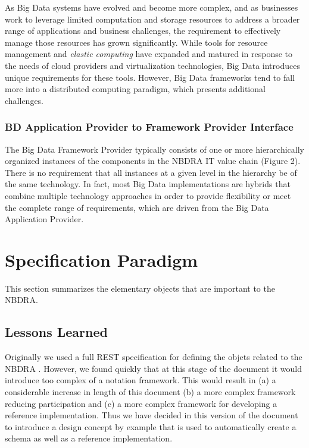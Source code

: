 \documentclass[10pt]{article}
\begin{document}
As Big Data systems have evolved and become more complex, and as
businesses work to leverage limited computation and storage resources
to address a broader range of applications and business challenges,
the requirement to effectively manage those resources has grown
significantly. While tools for resource management and {\it elastic
computing} have expanded and matured in response to the needs of cloud
providers and virtualization technologies, Big Data introduces unique
requirements for these tools. However, Big Data frameworks tend to
fall more into a distributed computing paradigm, which presents
additional challenges.

\subsubsection{BD Application Provider to Framework Provider
  Interface}\label{S:r-app-provider}

The Big Data Framework Provider typically consists of one or more
hierarchically organized instances of the components in the NBDRA IT
value chain (Figure 2). There is no requirement that all instances at
a given level in the hierarchy be of the same technology. In fact,
most Big Data implementations are hybrids that combine multiple
technology approaches in order to provide flexibility or meet the
complete range of requirements, which are driven from the Big Data
Application Provider.


	
\section{Specification Paradigm}

This section summarizes the elementary objects that are important to
the NBDRA.

\subsection{Lessons Learned}

Originally we used a full REST specification for defining the objets
related to the NBDRA \cite{cloudmesh-nist}. However, we found quickly
that at this stage of the document it would introduce too complex of a
notation framework.  This would result in (a) a considerable increase
in length of this document (b) a more complex framework reducing
participation and (c) a more complex framework for developing a
reference implementation. Thus we have decided in this version of the
document to introduce a design concept by example that is used to
automatically create a schema as well as a reference implementation.
\end{document}

